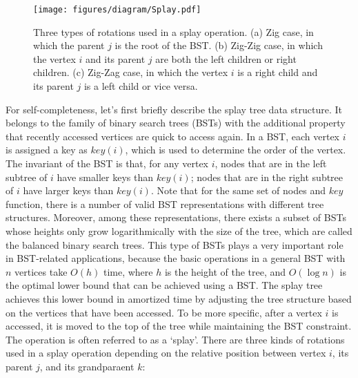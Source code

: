 \begin{figure}[tb]
  \centering
  \texttt{[image: figures/diagram/Splay.pdf]}
  \vspace{3ex}
  \caption{Three types of rotations used in a splay operation. (a) Zig case, in which the parent $j$ is the root of the BST.
  (b) Zig-Zig case, in which the vertex $i$ and its parent $j$ are both the left children or right children.
  (c) Zig-Zag case, in which the vertex $i$ is a right child and its parent $j$ is a left child or vice versa.}
  \label{fig:Splay}
\end{figure}
For self-completeness, let's first briefly describe the splay tree data structure. It belongs to the family of binary search trees (BSTs) with
the additional property that recently accessed vertices are quick to access again. In a BST, each vertex $i$ is assigned a
key as $key(i)$, which is used to determine the order of the vertex. The invariant of the BST is that, for any vertex
$i$, nodes that are in the left subtree of $i$ have smaller keys than $key(i)$; nodes that are in the right subtree of $i$ have larger
keys than $key(i)$. Note that for the same set of nodes and $key$ function, there is a number of valid BST representations with
different tree structures. Moreover, among these representations, there exists a subset of BSTs whose heights only grow logarithmically 
with the size of the tree, which are called the balanced binary search trees. This type of BSTs plays a very important role in BST-related applications, because
the basic operations in a general BST with $n$ vertices take $O(h)$ time, where $h$ is the height of the tree, and $O(\log n)$ is the optimal lower bound
that can be achieved using a BST. The splay tree achieves this lower bound in amortized time by adjusting the tree structure
based on the vertices that have been accessed. To be more specific, after a vertex $i$ is accessed, it is moved to the top of the tree while maintaining
the BST constraint. The operation is often referred to as a `splay'. There are three kinds of rotations used in a splay operation depending on the relative position
between vertex $i$, its parent $j$, and its grandparaent $k$:
\begin{caseof}
\end{caseof}

